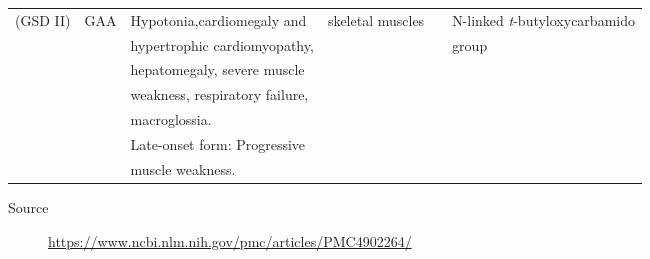 \documentclass[landscape]{article}
\begin{document}
\begin{longtable}{llllll}
(GSD II) & GAA & Hypotonia,cardiomegaly and & skeletal muscles &  & N-linked \emph{t}-butyloxycarbamido\\
 &  & hypertrophic cardiomyopathy, &  &  & group\\
 &  & hepatomegaly, severe muscle &  &  & \\
 &  & weakness, respiratory failure, &  &  & \\
 &  & macroglossia. &  &  & \\
 &  & Late-onset form: Progressive &  &  & \\
 &  & muscle weakness. &  &  & \\
\end{longtable}

\begin{description}
\item[{Source}] \url{https://www.ncbi.nlm.nih.gov/pmc/articles/PMC4902264/}
\end{description}
\end{document}
